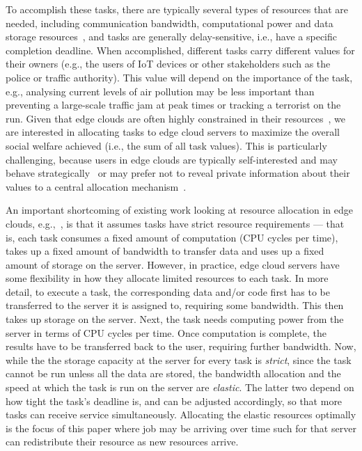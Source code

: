 \documentclass[sotoncolour]{uosproject}     %
\begin{document}
To accomplish these tasks, there are typically several types of resources that are needed, including communication
bandwidth, computational power and data storage resources~\cite{vaji_infocom}, and tasks are generally delay-sensitive,
i.e., have a specific completion deadline. When accomplished, different tasks carry different values for their owners
(e.g., the users of IoT devices or other stakeholders such as the police or traffic authority). This value will depend
on the importance of the task, e.g., analysing current levels of air pollution may be less important than preventing
a large-scale traffic jam at peak times or tracking a terrorist on the run. Given that edge clouds are often highly
constrained in their resources~\cite{edge_limitations}, we are interested in allocating tasks to edge cloud servers
to maximize the overall social welfare achieved (i.e., the sum of all task values). This is particularly challenging,
because users in edge clouds are typically self-interested and may behave strategically~\cite{Bi2019} or may prefer
not to reveal private information about their values to a central allocation mechanism~\cite{Pai2013}.

An important shortcoming of existing work looking at resource allocation in edge clouds, e.g.,~\cite{vaji_infocom,
Bi2019}, is that it assumes tasks have strict resource requirements --- that is, each task consumes a
fixed amount of computation (CPU cycles per time), takes up a fixed amount of bandwidth to transfer data and uses up a
fixed amount of storage on the server. However, in practice, edge cloud servers have some flexibility in how they
allocate limited resources to each task. In more detail, to execute a task, the corresponding data and/or code first
has to be transferred to the server it is assigned to, requiring some bandwidth. This then takes up storage on the
server. Next, the task needs computing power from the server in terms of CPU cycles per time. Once computation is
complete, the results have to be transferred back to the user, requiring further bandwidth. Now, while the the storage
capacity at the server for every task is \emph{strict}, since the task cannot be run unless all the data are stored,
the bandwidth allocation and the speed at which the task is run on the server are \emph{elastic}. The latter two depend
on how tight the task's deadline is, and can be adjusted  accordingly, so that more tasks can receive service
simultaneously. Allocating the elastic resources optimally is the focus of this paper where job may be arriving over
time such for that server can redistribute their resource as new resources arrive.
\end{document}
